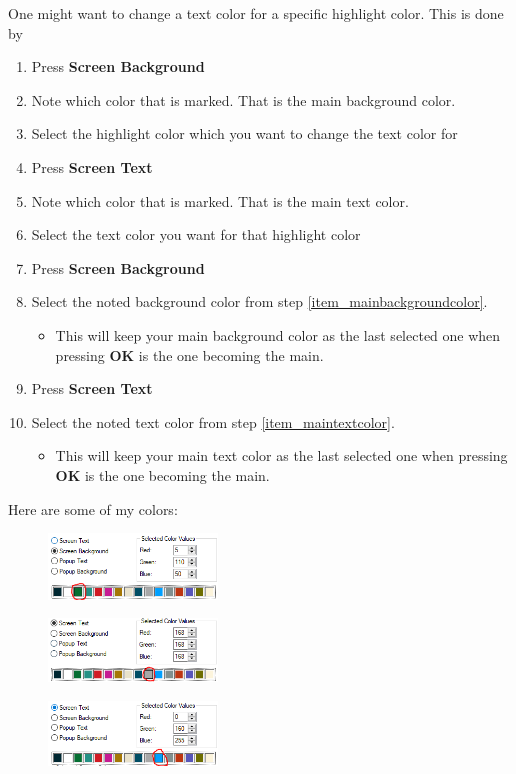 One might want to change a text color for a specific highlight color. This is done by

\begin{enumerate}
    \item Press \textbf{Screen Background}
    \item Note which color that is marked. That is the main background color.\label{item_mainbackgroundcolor}
    \item Select the highlight color which you want to change the text color for
    \item Press \textbf{Screen Text}
    \item Note which color that is marked. That is the main text color.\label{item_maintextcolor}
    \item Select the text color you want for that highlight color
    \item Press \textbf{Screen Background}
    \item Select the noted background color from step \ref{item_mainbackgroundcolor}.
    \begin{itemize}
        \item This will keep your main background color as the last selected one when pressing \textbf{OK} is the one becoming the main.
    \end{itemize}
    \item Press \textbf{Screen Text}
    \item Select the noted text color from step \ref{item_maintextcolor}.
    \begin{itemize}
        \item This will keep your main text color as the last selected one when pressing \textbf{OK} is the one becoming the main.
    \end{itemize}
\end{enumerate}
\newpage
Here are some of my colors:

\begin{figure}[H]
    \centering
    \includegraphics[width = 0.4\textwidth]{Figures/WSL/color_1.PNG}
\end{figure}

\begin{figure}[H]
    \centering
    \includegraphics[width = 0.4\textwidth]{Figures/WSL/color_2.PNG}
\end{figure}

\begin{figure}[H]
    \centering
    \includegraphics[width = 0.4\textwidth]{Figures/WSL/color_3.PNG}
\end{figure}